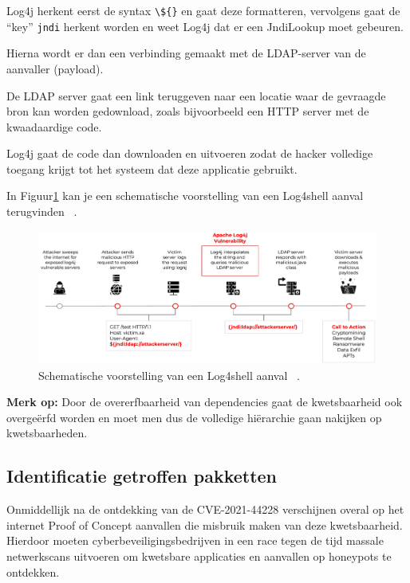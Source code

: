 \documentclass{hogent-article}
\begin{document}
Log4j herkent eerst de syntax \verb|\${}| en gaat deze formatteren, vervolgens gaat de ``key'' \verb|jndi| herkent worden en weet Log4j dat er een JndiLookup moet gebeuren.

Hierna wordt er dan een verbinding gemaakt met de LDAP-server van de aanvaller (payload).

De LDAP server gaat een link teruggeven naar een locatie waar de gevraagde bron kan worden gedownload, 
zoals bijvoorbeeld een HTTP server met de kwaadaardige code. 

Log4j gaat de code dan downloaden en uitvoeren zodat de hacker volledige toegang krijgt tot het systeem dat deze applicatie gebruikt.

In Figuur\ref{fig:log4shell-schema} kan je een schematische voorstelling van een Log4shell aanval terugvinden ~\autocite{Zscaler2021}.

\begin{figure}[!ht]
    \centering
    \includegraphics[width=1\linewidth]{img/log4shell-schema.png}
    \caption{Schematische voorstelling van een Log4shell aanval ~\autocite{Zscaler2021}.}
    \label{fig:log4shell-schema}
\end{figure}

{\bf Merk op:}
Door de overerfbaarheid van dependencies gaat de kwetsbaarheid ook overgeërfd worden en moet men dus de volledige hiërarchie gaan nakijken op kwetsbaarheden.


\subsection{Identificatie getroffen pakketten}

Onmiddellijk na de ontdekking van de CVE-2021-44228 verschijnen overal op het internet Proof of Concept aanvallen die misbruik maken van deze kwetsbaarheid. Hierdoor moeten cyberbeveiligingsbedrijven in een race tegen de tijd massale netwerkscans uitvoeren om kwetsbare applicaties en aanvallen op honeypots te ontdekken.
\end{document}
